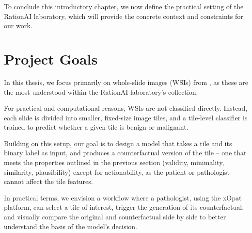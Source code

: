 To conclude this introductory chapter,
we now define the practical setting of the RationAI laboratory,
which will provide the concrete context and constraints for our work.

\section{Project Goals}

In this thesis, we focus primarily on whole-slide images (WSIs) from \dataset,
as these are the most understood within the RationAI laboratory's collection.

For practical and computational reasons, WSIs are not classified directly.
Instead, each slide is divided into smaller, fixed-size image tiles,
and a tile-level classifier is trained to predict whether a given tile is benign or malignant.

Building on this setup, our goal is to design a model that
takes a tile and its binary label as input,
and produces a counterfactual version of the tile -- one that meets the properties outlined in the previous section
(validity, minimality, similarity, plausibility) except for actionability, as the patient or pathologist cannot affect the tile features.

In practical terms, we envision a workflow where a pathologist, using the xOpat platform, can select a tile of interest,
trigger the generation of its counterfactual,
and visually compare the original and counterfactual side by side
to better understand the basis of the model's decision.
